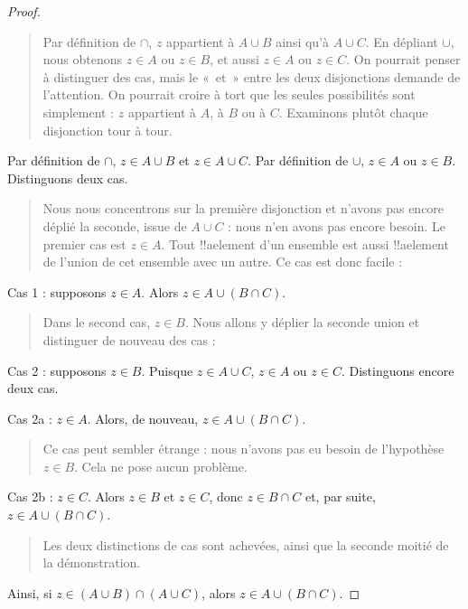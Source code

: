 \documentclass[../../../include/open-logic-section]{subfiles}
\begin{document}
\begin{proof}
\begin{quote}
Par définition de $\cap$, $z$ appartient
à $A \cup B$ ainsi qu'à $A \cup C$.
En dépliant $\cup$, nous obtenons
$z \in A$ ou $z \in B$, et aussi
$z \in A$ ou $z \in C$. On pourrait
penser à distinguer des cas, mais
le «~et~» entre les deux disjonctions
demande de l'attention. On pourrait
croire à tort que les seules
possibilités sont simplement :
$z$ appartient à $A$, à $B$ ou
à $C$. Examinons plutôt chaque
disjonction tour à tour.
\end{quote}
Par définition de $\cap$,
$z \in A \cup B$ et
$z \in A \cup C$.
Par définition de $\cup$,
$z \in A$ ou $z \in B$.
Distinguons deux cas.
\begin{quote}
Nous nous concentrons sur la
première disjonction et n'avons
pas encore déplié la seconde,
issue de $A \cup C$ : nous
n'en avons pas encore besoin.
Le premier cas est $z \in A$.
Tout !!a{element} d'un ensemble
est aussi !!a{element} de l'union
de cet ensemble avec un autre.
Ce cas est donc facile :
\end{quote}
Cas 1 : supposons $z \in A$.
Alors $z \in A \cup (B \cap C)$.
\begin{quote}
Dans le second cas, $z \in B$.
Nous allons y déplier la
seconde union et distinguer
de nouveau des cas :
\end{quote}
Cas 2 : supposons $z \in B$.
Puisque $z \in A \cup C$,
$z \in A$ ou $z \in C$.
Distinguons encore deux cas.

Cas 2a : $z \in A$. Alors, de nouveau,
$z \in A \cup (B \cap C)$.
\begin{quote}
Ce cas peut sembler étrange :
nous n'avons pas eu besoin
de l'hypothèse $z \in B$.
Cela ne pose aucun problème.
\end{quote}
Cas 2b : $z \in C$. Alors
$z \in B$ et $z \in C$, donc
$z \in B \cap C$ et, par suite,
$z \in A \cup (B \cap C)$.
\begin{quote}
Les deux distinctions de cas
sont achevées, ainsi que la
seconde moitié de la démonstration.
\end{quote}
Ainsi, si
$z \in (A \cup B) \cap (A \cup C)$,
alors $z \in A \cup (B \cap C)$.
\end{proof}
\end{document}
